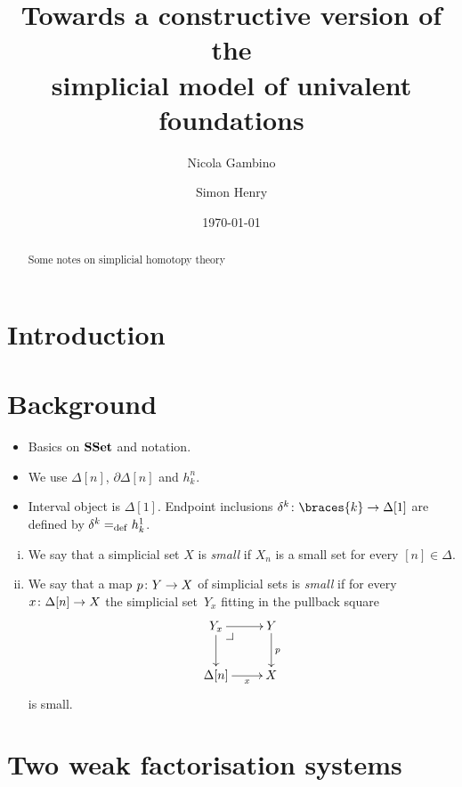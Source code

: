 \documentclass[reqno,10pt,a4paper,oneside,draft]{amsart}
\title[]{Towards a constructive version of the \\ simplicial model of univalent foundations}
\begin{document}
\begin{abstract}
Some notes on simplicial homotopy theory
\end{abstract}

\author{Nicola Gambino}

\author{Simon Henry}


 \date{\today}

\maketitle

\section{Introduction}

\newpage


\section{Background}


\begin{itemize}
\item Basics on $\mathbf{SSet}$ and notation. 
\item We use $\Delta[n]$, $\partial \Delta[n]$ and $h^n_k$.
\item Interval object is $\Delta[1]$. Endpoint inclusions $\kcyl \co \braces{ k} \to \Delta[1]$ are
defined by $\delta^k =_{\operatorname{def}} h^1_k$.
\end{itemize}


\begin{definition} \hfill 
\label{thm:small}
\begin{enumerate}[(i)]
\item We say that a simplicial set $X$ is \emph{small}  if $X_n$ is a small set for every $[n] \in \Delta$. 
\item We say that a map $p \colon Y \to X$ of simplicial sets is \emph{small} if for every $x \colon \Delta[n] 
\to X$ the simplicial set~$Y_x$ fitting in the pullback square
\[
\xymatrix{
Y_x \ar[r] \ar[d] \drpullback & Y \ar[d]^{p} \\
\Delta[n] \ar[r]_-{x} & X }
\]
is small.
\end{enumerate}
\end{definition} 


\section{Two weak factorisation systems} 
\end{document}
